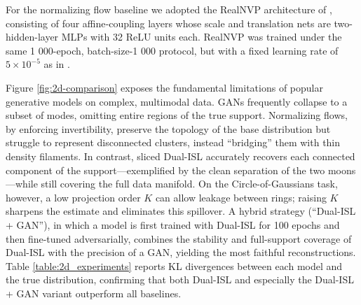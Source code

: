 \documentclass{article}
\begin{document}
For the normalizing flow baseline we adopted the RealNVP architecture of \cite{dinh2016density}, consisting of four affine‐coupling layers whose scale and translation nets are two-hidden-layer MLPs with 32 ReLU units each.  RealNVP was trained under the same 1 000-epoch, batch-size-1 000 protocol, but with a fixed learning rate of $5\times10^{-5}$ as in \cite{Stimper2023}.

Figure \ref{fig:2d-comparison} exposes the fundamental limitations of popular generative models on complex, multimodal data.  GANs frequently collapse to a subset of modes, omitting entire regions of the true support.  Normalizing flows, by enforcing invertibility, preserve the topology of the base distribution but struggle to represent disconnected clusters, instead “bridging” them with thin density filaments.  In contrast, sliced Dual-ISL accurately recovers each connected component of the support—exemplified by the clean separation of the two moons—while still covering the full data manifold.  On the Circle-of-Gaussians task, however, a low projection order $K$ can allow leakage between rings; raising $K$ sharpens the estimate and eliminates this spillover.  A hybrid strategy (“Dual-ISL + GAN”), in which a model is first trained with Dual-ISL for 100 epochs and then fine-tuned adversarially, combines the stability and full-support coverage of Dual-ISL with the precision of a GAN, yielding the most faithful reconstructions.  Table \ref{table:2d_experiments} reports KL divergences between each model and the true distribution, confirming that both Dual-ISL and especially the Dual-ISL + GAN variant outperform all baselines.
\end{document}
